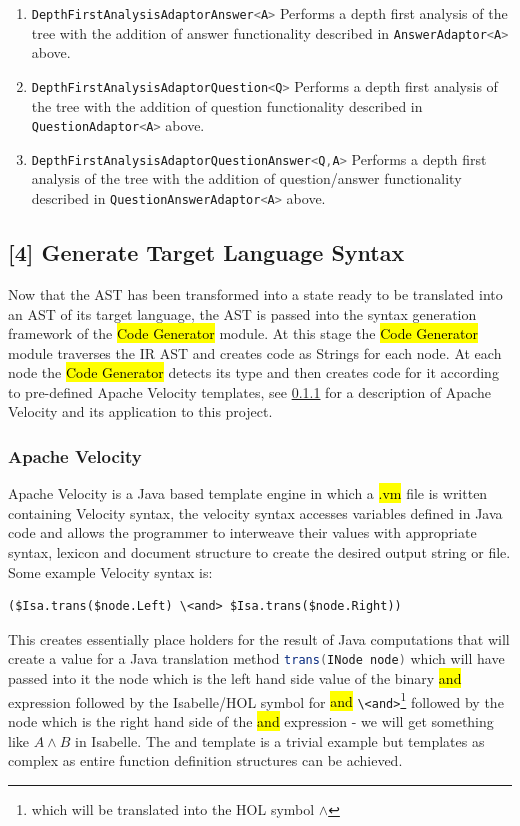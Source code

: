 \begin{enumerate}
		\item \lstinline[language=Java]{DepthFirstAnalysisAdaptorAnswer<A>} Performs a depth first analysis of the tree with the addition of answer functionality described in  \lstinline[language=Java]{AnswerAdaptor<A>} above.
		\item \lstinline[language=Java]{DepthFirstAnalysisAdaptorQuestion<Q>} Performs a depth first analysis of the tree with the addition of question functionality described in  \lstinline[language=Java]{QuestionAdaptor<A>} above.
		\item \lstinline[language=Java]{DepthFirstAnalysisAdaptorQuestionAnswer<Q,A>} Performs a depth first analysis of the tree with the addition of question/answer functionality described in  \lstinline[language=Java]{QuestionAnswerAdaptor<A>} above.
	\end{enumerate} 


	\subsection{	[4] Generate Target Language Syntax}
	Now that the AST has been transformed into a state ready to be translated into an AST of its target language, the AST is passed into the syntax generation framework of the \ttfamily\hl{Code Generator} \rmfamily module. At this stage the \ttfamily\hl{Code Generator} \rmfamily module traverses the IR AST and creates code as Strings for each node. At each node the \ttfamily\hl{Code Generator} \rmfamily detects its type and then creates code for it according to pre-defined Apache Velocity templates, see \ref{av} for a description of Apache Velocity and its application to this project.
	\subsubsection{Apache Velocity} \label{av}
	Apache Velocity is a Java based template engine in which a \ttfamily\hl{.vm} \rmfamily file is written containing Velocity syntax, the velocity syntax accesses variables defined in Java code and allows the programmer to interweave their values with appropriate syntax, lexicon and document structure to create the desired output string or file. Some example Velocity syntax is:
	\hfill\break
	\begin{lstlisting}[language=Velocity]
		($Isa.trans($node.Left) \<and> $Isa.trans($node.Right))
	\end{lstlisting} 
	\hfill\break
	This creates essentially place holders for the result of Java computations that will create a value for a Java translation method \lstinline[language=Java]{trans(INode node)} which will have passed into it the node which is the left hand side value of the binary \ttfamily\hl{and} \rmfamily expression followed by the Isabelle/HOL symbol for \ttfamily\hl{and} \rmfamily \lstinline[language=Isabelle]{\<and>}\footnote{which will be translated into the HOL symbol $\wedge$} followed by the node which is the right hand side of the \ttfamily\hl{and} \rmfamily expression - we will get something like $A \wedge B$ in Isabelle. The and template is a trivial example but templates as complex as entire function definition structures can be achieved. 

